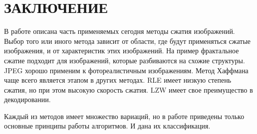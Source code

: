 \chapter*{ЗАКЛЮЧЕНИЕ}

В работе описана часть применяемых сегодня методы сжатия изображений.
Выбор того или иного метода зависит от области, где будут применяться сжатые изображения, и от характеристик этих изображений. На пример фрактальное сжатие подходит для изображений, которые разбиваются на схожие структуры. JPEG хорошо применим к фотореалистичным изображениям. Метод Хаффмана чаще всего является этапом в других методах. RLE имеет низкую степень сжатия, но при этом высокую скорость сжатия. LZW имеет свое преимущество в декодировании.

 Каждый из методов имеет множество
вариаций, но в работе приведены только основные принципы работы алгоритмов. 
И дана их классификация.


    
    
